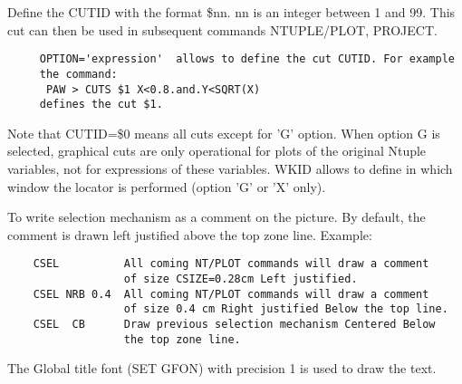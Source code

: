    \par
Define the CUTID with the format \$nn.  nn is an integer between 1 and 99.  
   This cut can then be used in subsequent commands NTUPLE/PLOT, PROJECT.  
\begin{verbatim}
     OPTION='expression'  allows to define the cut CUTID. For example
     the command:
      PAW > CUTS $1 X<0.8.and.Y<SQRT(X)
     defines the cut $1.
\end{verbatim}
   \par
Note that CUTID=\$0 means all cuts except for 'G' option.  When option G is 
   selected, graphical cuts are only operational for plots of the original 
   Ntuple variables, not for expressions of these variables.  WKID allows to 
   define in which window the locator is performed (option 'G' or 'X' only).  

\ENDCMD


\BEGARG
{}
\ENDARG
{}
\ENDOPT

   \par
To write selection mechanism as a comment on the picture.  By default, the 
   comment is drawn left justified above the top zone line.  Example:  
\begin{verbatim}
    CSEL          All coming NT/PLOT commands will draw a comment
                  of size CSIZE=0.28cm Left justified.
    CSEL NRB 0.4  All coming NT/PLOT commands will draw a comment
                  of size 0.4 cm Right justified Below the top line.
    CSEL  CB      Draw previous selection mechanism Centered Below
                  the top zone line.
\end{verbatim}
   \par
The Global title font (SET GFON) with precision 1 is used to draw the text. 

\ENDCMD

